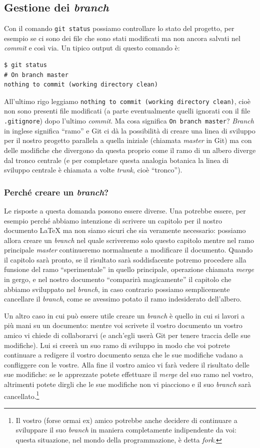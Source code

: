 \documentclass[a4paper,12pt,oneside]{article}
\begin{document}
\subsection{Gestione dei \emph{branch}}
Con il comando \lstinline|git status| possiamo controllare lo stato del progetto,
per esempio se ci sono dei file che sono stati modificati ma non ancora salvati
nel \emph{commit} e così via. Un tipico output di questo comando è:
\begin{lstlisting}
$ git status
# On branch master
nothing to commit (working directory clean)
\end{lstlisting}
All'ultimo rigo leggiamo \lstinline|nothing to commit (working directory clean)|,
cioè non sono presenti file modificati (a parte eventualmente quelli ignorati con
il file \lstinline|.gitignore|) dopo l'ultimo \emph{commit}. Ma cosa significa
\lstinline|On branch master|? \emph{Branch} in inglese significa ``ramo'' e
Git ci dà la possibilità di creare una linea di sviluppo per il nostro progetto
parallela a quella iniziale (chiamata \emph{master} in Git) ma con delle
modifiche che divergono da questa proprio come il ramo di un albero diverge dal
tronco centrale (e per completare questa analogia botanica la linea di sviluppo
centrale è chiamata a volte \emph{trunk}, cioè ``tronco'').

\subsubsection{Perché creare un \emph{branch}?}
Le risposte a questa domanda possono essere diverse. Una potrebbe essere, per
esempio perché abbiamo intenzione di scrivere un capitolo per il nostro documento
\LaTeX{} ma non siamo sicuri che sia veramente necessario: possiamo allora creare
un \emph{branch} nel quale scriveremo solo questo capitolo mentre nel ramo
principale \emph{master} continueremo normalmente a modificare il documento.
Quando il capitolo sarà pronto, se il risultato sarà soddisfacente potremo
procedere alla funsione del ramo ``sperimentale'' in quello principale, operazione
chiamata \emph{merge} in gergo, e nel nostro documento ``comparirà magicamente''
il capitolo che abbiamo sviluppato nel \emph{branch}, in caso contrario possiamo
semplicemente cancellare il \emph{branch}, come se avessimo potato il ramo
indesiderato dell'albero.

Un altro caso in cui può essere utile creare un \emph{branch} è quello in cui si
lavori a più mani su un documento: mentre voi scrivete il vostro documento un
vostro amico vi chiede di collaborarvi (e anch'egli userà Git per tenere traccia
delle sue modifiche). Lui si creerà un suo ramo di sviluppo in modo che voi
potrete continuare a redigere il vostro documento senza che le sue modifiche
vadano a confliggere con le vostre. Alla fine il vostro amico vi farà vedere il
risultato delle sue modifiche: se le apprezzate potete effettuare il \emph{merge}
del suo ramo nel vostro, altrimenti potete dirgli che le sue modifiche non vi
piacciono e il suo \emph{branch} sarà cancellato.\footnote{Il vostro (forse ormai
  ex) amico potrebbe anche decidere di continuare a sviluppare il suo
  \emph{branch} in maniera completamente indipendente da voi: questa situazione,
  nel mondo della programmazione, è detta \emph{fork}.}
\end{document}
